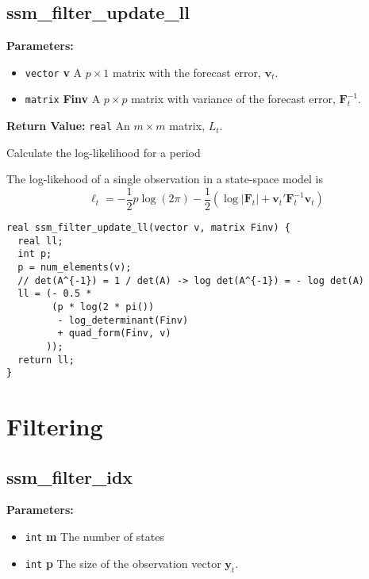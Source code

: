 \documentclass[]{book}
\providecommand{\tightlist}{%
  \setlength{\itemsep}{0pt}\setlength{\parskip}{0pt}}
\newcommand{\mat}[1]{\boldsymbol{#1}}
\renewcommand{\vec}[1]{\boldsymbol{#1}}
\begin{document}
\subsection{ssm\_filter\_update\_ll}\label{ssmux5ffilterux5fupdateux5fll}

\textbf{Parameters:}

\begin{itemize}
\tightlist
\item
  \texttt{vector} \textbf{v} A \(p \times 1\) matrix with the forecast
  error, \(\vec{v}_t\).
\item
  \texttt{matrix} \textbf{Finv} A \(p \times p\) matrix with variance of
  the forecast error, \(\mat{F}^{-1}_t\).
\end{itemize}

\textbf{Return Value:} \texttt{real} An \(m \times m\) matrix, \(L_t\).

Calculate the log-likelihood for a period

The log-likehood of a single observation in a state-space model is \[
\ell_t = - \frac{1}{2} p \log(2 \pi) - \frac{1}{2} \left(\log|\mat{F}_t| + \vec{v}_t' \mat{F}^{-1}_t \vec{v}_t  \right)
\]

\begin{verbatim}
real ssm_filter_update_ll(vector v, matrix Finv) {
  real ll;
  int p;
  p = num_elements(v);
  // det(A^{-1}) = 1 / det(A) -> log det(A^{-1}) = - log det(A)
  ll = (- 0.5 *
        (p * log(2 * pi())
         - log_determinant(Finv)
         + quad_form(Finv, v)
       ));
  return ll;
}
\end{verbatim}

\section{Filtering}\label{filtering-2}

\subsection{ssm\_filter\_idx}\label{ssmux5ffilterux5fidx}

\textbf{Parameters:}

\begin{itemize}
\tightlist
\item
  \texttt{int} \textbf{m} The number of states
\item
  \texttt{int} \textbf{p} The size of the observation vector
  \(\vec{y}_t\).
\end{itemize}
\end{document}
